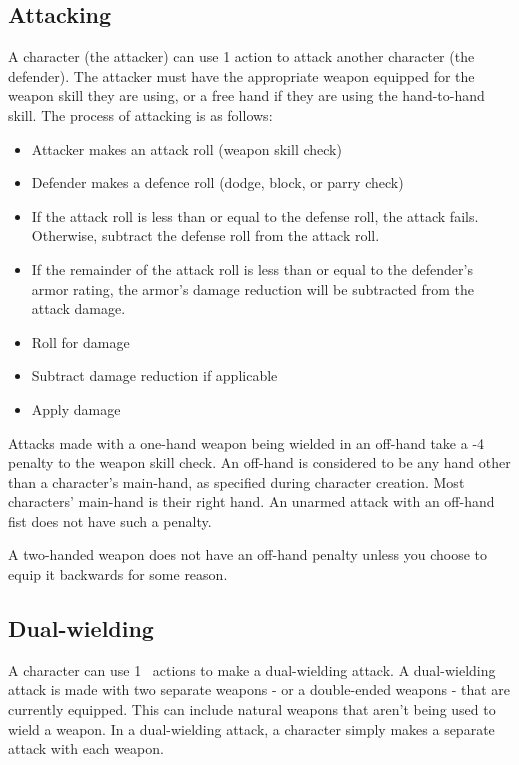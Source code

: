 \begin{multicols*}{2}
    \section{Attacking}\label{combat:attacking}
    A character (the attacker) can use 1 action to attack another character
    (the defender). The attacker must have the appropriate weapon equipped
    for the weapon skill they are using, or a free hand if they are using
    the hand-to-hand skill. The process of attacking is as follows:
    \begin{itemize}
        \item Attacker makes an attack roll (weapon skill check)
        \item Defender makes a defence roll (dodge, block, or parry check)
        \item If the attack roll is less than or equal to the defense roll, the
                attack fails. Otherwise, subtract the defense roll from the
                attack roll.
        \item If the remainder of the attack roll is less than or equal to the
                defender's armor rating, the armor's damage reduction will be
                subtracted from the attack damage.
        \item Roll for damage
        \item Subtract damage reduction if applicable
        \item Apply damage
    \end{itemize}

    Attacks made with a one-hand weapon being wielded in an off-hand take a -4
    penalty to the weapon skill check. An off-hand is considered to be any hand
    other than a character's main-hand, as specified during character creation.
    Most characters' main-hand is their right hand. An unarmed attack with an
    off-hand fist does not have such a penalty.

    A two-handed weapon does not have an off-hand penalty unless you choose to
    equip it backwards for some reason.

    \subsection{Dual-wielding}\label{combat:dual-wielding}
    A character can use 1 \textonehalf\ actions to make a dual-wielding
    attack. A dual-wielding attack is made with two separate weapons - or a
    double-ended weapons - that are currently equipped. This can include
    natural weapons that aren't being used to wield a weapon. In a
    dual-wielding attack, a character simply makes a separate attack with each
    weapon.


\end{multicols*}
